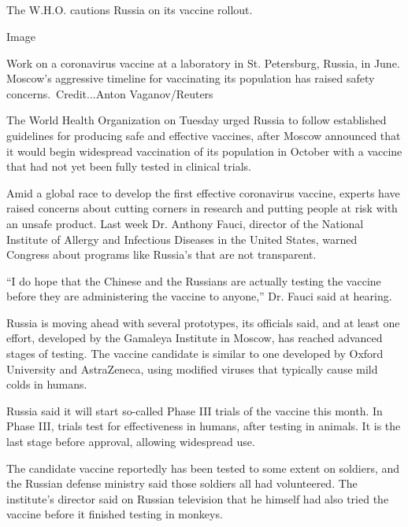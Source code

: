 \hypertarget{-5}{%
\subsection{}\label{-5}}

The W.H.O. cautions Russia on its vaccine rollout.

Image

Work on a coronavirus vaccine at a laboratory in St. Petersburg, Russia,
in June. Moscow's aggressive timeline for vaccinating its population has
raised safety concerns.~Credit...Anton Vaganov/Reuters

The World Health Organization on Tuesday urged Russia to follow
established guidelines for producing safe and effective vaccines, after
Moscow announced that it would begin widespread vaccination of its
population in October with a vaccine that had not yet been fully tested
in clinical trials.

Amid a global race to develop the first effective coronavirus vaccine,
experts have raised concerns about cutting corners in research and
putting people at risk with an unsafe product. Last week Dr. Anthony
Fauci, director of the National Institute of Allergy and Infectious
Diseases in the United States, warned Congress about programs like
Russia's that are not transparent.

``I do hope that the Chinese and the Russians are actually testing the
vaccine before they are administering the vaccine to anyone,'' Dr. Fauci
said at hearing.

Russia is moving ahead with several prototypes, its officials said, and
at least one effort, developed by the Gamaleya Institute in Moscow, has
reached advanced stages of testing. The vaccine candidate is similar to
one developed by Oxford University and AstraZeneca, using modified
viruses that typically cause mild colds in humans.

Russia said it will start so-called Phase III trials of the vaccine this
month. In Phase III, trials test for effectiveness in humans, after
testing in animals. It is the last stage before approval, allowing
widespread use.

The candidate vaccine reportedly has been tested to some extent on
soldiers, and the Russian defense ministry said those soldiers all had
volunteered. The institute's director said on Russian television that he
himself had also tried the vaccine before it finished testing in
monkeys.

\hypertarget{-6}{%
\subsection{}\label{-6}}

